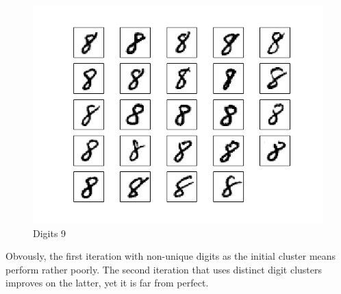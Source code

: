 \documentclass[10pt]{article}
\begin{document}
\begin{figure}
\begin{center}
\includegraphics[scale=0.5]{meansB9}
\caption{Digits 9}
\end{center}
\end{figure}
Obvously, the first iteration with non-unique digits as the initial cluster means perform rather poorly. The second iteration that uses distinct digit clusters improves on the latter, yet it is far from perfect.

\clearpage
\end{document}
